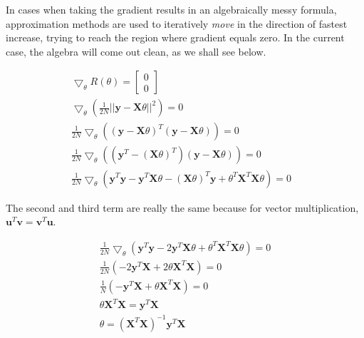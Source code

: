 \documentclass{ecctd01} %
\begin{document}
In cases when taking the gradient results in an algebraically messy
formula, approximation  methods are used to iteratively {\em move} in the
direction of fastest increase, trying to reach the region where
gradient equals zero. In the current case, the algebra will come out clean,
as we shall see below.

\begin{eqnarray*}
  \label{eq:reg6}
  \bigtriangledown_{\theta} R\left(\theta\right) = \left[ \begin{array}{c}
      0 \\
      0 
    \end{array} \right] &  \nonumber \\
  \bigtriangledown_{\theta}\left( \frac{1}{2N}||\mathbf{y} -
  \mathbf{X}\theta||^2\right) = 0 \nonumber \\
  \frac{1}{2N}  \bigtriangledown_{\theta} \left(
  \left(\mathbf{y} -  \mathbf{X}\theta \right) ^T
  \left( \mathbf{y} -  \mathbf{X}\theta \right)
  \right) = 0 \nonumber \\
  \frac{1}{2N}  \bigtriangledown_{\theta} \left(
  \left(\mathbf{y}^T -  \left(\mathbf{X}\theta\right)^T \right)
  \left( \mathbf{y} -  \mathbf{X}\theta \right)
  \right) = 0 \nonumber \\
  \frac{1}{2N}  \bigtriangledown_{\theta} \left(
  \mathbf{y}^T\mathbf{y} -
  \mathbf{y}^T\mathbf{X}\theta -
  \left( \mathbf{X}\theta \right)^T\mathbf{y} +
  \theta^T\mathbf{X}^T\mathbf{X}\theta
  \right) = 0 \nonumber 
\end{eqnarray*}

The second and third term are really the same because for vector
multiplication, $\mathbf{u}^T \mathbf{v} = \mathbf{v}^T \mathbf{u}$.  

\begin{eqnarray}
  \label{eq:reg7}
  \frac{1}{2N}  \bigtriangledown_{\theta} \left(
  \mathbf{y}^T\mathbf{y} -2
  \mathbf{y}^T\mathbf{X}\theta +
  \theta^T\mathbf{X}^T\mathbf{X}\theta
  \right) = 0 \nonumber \\
  \frac{1}{2N} \left(
  -2\mathbf{y}^T\mathbf{X}
  +2\theta\mathbf{X}^T\mathbf{X} \right) = 0 \nonumber \\
  \frac{1}{N} \left(
  -\mathbf{y}^T\mathbf{X}
  +\theta\mathbf{X}^T\mathbf{X} \right) = 0 \nonumber \\
  \theta\mathbf{X}^T\mathbf{X} =
  \mathbf{y}^T\mathbf{X} \nonumber \\
  \theta = \left(\mathbf{X}^T\mathbf{X}\right)^{-1}
  \mathbf{y}^T\mathbf{X}
\end{eqnarray}
\end{document}
